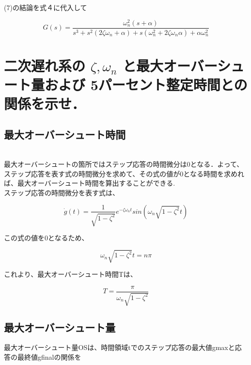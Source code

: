 \documentclass[xelatex,ja=standard,jafont=noto]{bxjsarticle}
\numberwithin{figure}{section}
\begin{document}
\newpage

(7)の結論を式４に代入して

\begin{equation}
    G(s)=\frac{\omega_{n}^{2}(s+\alpha)}{s^{3}+s^{2}(2\zeta\omega_{n}+\alpha)+s(\omega_{n}^{2}+2\zeta\omega_{n}\alpha)+\alpha\omega_{n}^{2}}
\end{equation}


\section{二次遅れ系の $ \zeta,\omega_{n}$ と最大オーバーシュート量および 5パーセント整定時間との関係を示せ．}

\subsection{最大オーバーシュート時間}\\

最大オーバーシュートの箇所ではステップ応答の時間微分は0となる．よって、ステップ応答を表す式の時間微分を求めて、その式の値が0となる時間を求めれば、最大オーバーシュート時間を算出することができる.\\

 

ステップ応答の時間微分を表す式は、

\begin{equation}
    \Dot{g}(t)=\frac{1}{\sqrt{1-\zeta^{2}}}e^{-\zeta\omega_{n}t}sin(\omega_{n}\sqrt{1-\zeta^{2}}t)
\end{equation}

    この式の値を0となるため、
    
    \begin{equation}
        \omega_{n}\sqrt{1-\zeta^{2}}t=n\pi
    \end{equation}
    
    これより、最大オーバーシュート時間Tは、
    
    \begin{equation}
        T=\frac{\pi}{\omega_{n}\sqrt{1-\zeta^{2}}}
    \end{equation}

\subsection{最大オーバーシュート量}

最大オーバーシュート量OSは、時間領域tでのステップ応答の最大値gmaxと応答の最終値gfinalの関係を
\end{document}
